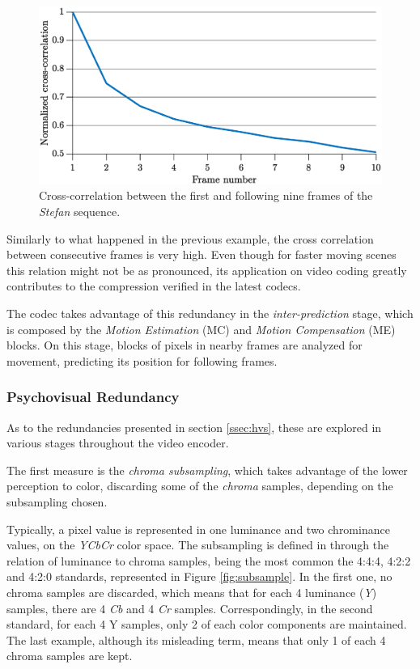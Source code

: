 \begin{figure}[h]
    \centering
    \includegraphics[width=\textwidth]{Sections/2AV1/Diagrams/intercorr.eps}
    \caption{Cross-correlation between the first and following nine frames of the \emph{Stefan} sequence.}
    \label{fig:crosscorr}
\end{figure}

Similarly to what happened in the previous example, the cross correlation between consecutive frames is very high. Even though for faster moving scenes this relation might not be as pronounced, its application on video coding greatly contributes to the compression verified in the latest codecs. 

The codec takes advantage of this redundancy in the \emph{inter-prediction} stage, which is composed by the \emph{Motion Estimation} (MC) and \emph{Motion Compensation} (ME) blocks. On this stage, blocks of pixels in nearby frames are analyzed for movement, predicting its position for following frames.

\subsubsection{Psychovisual Redundancy}

As to the redundancies presented in section \ref{ssec:hvs}, these are explored in various stages throughout the video encoder.

The first measure is the \emph{chroma subsampling}, which takes advantage of the lower perception to color, discarding some of the \emph{chroma} samples, depending on the subsampling chosen.

Typically, a pixel value is represented in one luminance and two chrominance values, on the \emph{YCbCr} color space. The subsampling is defined in through the relation of luminance to chroma samples, being the most common the 4:4:4, 4:2:2 and 4:2:0 standards, represented in Figure \ref{fig:subsample}. In the first one, no chroma samples are discarded, which means that for each 4 luminance (\emph{Y}) samples, there are 4 \emph{Cb} and 4 \emph{Cr} samples. Correspondingly, in the second standard, for each 4 Y samples, only 2 of each color components are maintained. The last example, although its misleading term, means that only 1 of each 4 chroma samples are kept.

